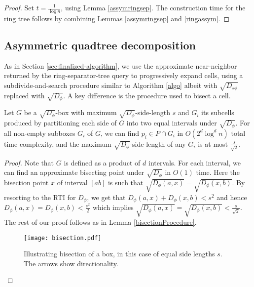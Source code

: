 \documentclass[11pt]{myclass}
\newcommand{\breg}{\ensuremath{D_\phi}}
\newcommand{\sbreg}{\ensuremath{D_{s\phi}}}
\begin{document}
\begin{proof}
 Set $t = \frac{1}{\log n}$, using Lemma \ref{assymringsep}. The construction time for the ring tree follows by combining Lemmas \ref{assymringsep}
and \ref{ringassym}.
\end{proof}



\subsection{Asymmetric quadtree decomposition}
\label{subsec:quadextension}

As in Section \ref{sec:finalized-algorithm}, we use the approximate near-neighbor returned by the ring-separator-tree query to progressively expand cells, using a subdivide-and-search procedure similar to Algorithm \ref{algo} albeit with 
$\sqrt{\sbreg}$ replaced with $\sqrt{\breg}$. A key difference is the procedure used to bisect a cell. 



\begin{lemma}\label{bisectionasymmetric}
Let $G$ be a $\sqrt{\breg}$-box with maximum $\sqrt{\breg}$-side-length $s$ and $G_i$ its subcells 
produced by partitioning each side of $G$ into two equal intervals under $\sqrt{\breg}$. For all non-empty subboxes $G_i$ of $G$, we can find $p_i \in P \cap G_i$ in $O(2^d \log^{d} n)$ total time complexity, and the maximum $\sqrt{\breg}$-side-length of any $G_i$ is at most $\frac{s}{\sqrt{2}}$.
\end{lemma}
\begin{proof}
 Note that $G$ is defined as a product of $d$ intervals. For each interval, we can find an approximate bisecting point 
under $\sqrt{\breg}$ in $O(1)$ time. Here the bisection point $x$ of interval $[a b]$ is such that 
$\sqrt{\breg(a,x)} = \sqrt{\breg(x,b)}$. By resorting to the RTI for $\breg$, we get that $\breg(a,x) + \breg(x,b) < s^2$ and hence $\breg(a,x) = \breg(x,b) < \frac{s^2}{2}$ which implies $\sqrt{\breg(a,x)} = 
\sqrt{\breg(x,b)} < \frac{s}{\sqrt{2}}$. The rest of our proof follows as in Lemma \ref{bisectionProcedure}.

\begin{figure}[H]
  \begin{center}
    \texttt{[image: bisection.pdf]}
  \end{center}
  \caption{Illustrating bisection of a box, in this case of equal side lengths $s$. The arrows show directionality. }
\end{figure}
\end{proof}
\end{document}
